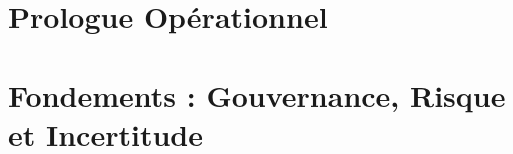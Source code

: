 \documentclass[12pt, twoside, openright, a4paper]{book}
\begin{document}
\frontmatter

    
    \cleardoublepage

    
    \cleardoublepage

    
    \cleardoublepage

    
    \cleardoublepage

    \tableofcontents
    \cleardoublepage

    \listoffigures
    \listoftables
    \cleardoublepage

\mainmatter

    \part*{Prologue Opérationnel}

        \setcounter{chapter}{-1}
        

    \part{Fondements : Gouvernance, Risque et Incertitude}
    \label{part:fondements}

        
        
\end{document}
